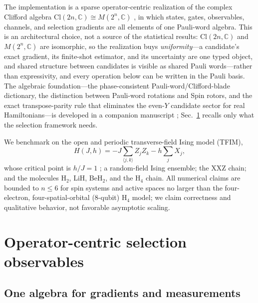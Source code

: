 \documentclass[aps,pra,reprint,superscriptaddress,nofootinbib,floatfix]{revtex4-2}
\newcommand{\Cl}{\mathrm{Cl}}
\newcommand{\C}{\mathbb{C}}
\begin{document}
The implementation is a sparse operator-centric realization of the complex Clifford algebra $\Cl(2n,\C)\cong M(2^n,\C)$ \cite{somaroo1998operations,hrdina2022clifford,silva2025operator}, in which states, gates, observables, channels, and selection gradients are all elements of one Pauli-word algebra. This is an architectural choice, not a source of the statistical results: $\Cl(2n,\C)$ and $M(2^n,\C)$ are isomorphic, so the realization buys \emph{uniformity}---a candidate's exact gradient, its finite-shot estimator, and its uncertainty are one typed object, and shared structure between candidates is visible as shared Pauli words---rather than expressivity, and every operation below can be written in the Pauli basis. The algebraic foundation---the phase-consistent Pauli-word/Clifford-blade dictionary, the distinction between Pauli-word rotations and Spin rotors, and the exact transpose-parity rule that eliminates the even-$Y$ candidate sector for real Hamiltonians---is developed in a companion manuscript \cite{utama2025operatorcentric}; Sec.~\ref{sec:foundation} recalls only what the selection framework needs.

We benchmark on the open and periodic transverse-field Ising model (TFIM),
\begin{equation}
H(J,h)=-J\sum_{\langle j,k\rangle}Z_jZ_k-h\sum_{j}X_j,
\label{eq:tfim}
\end{equation}
whose critical point is $h/J=1$ \cite{pfeuty1970ising}; a random-field Ising ensemble; the XXZ chain; and the molecules H$_2$, LiH, BeH$_2$, and the H$_4$ chain. All numerical claims are bounded to $n\le6$ for spin systems and active spaces no larger than the four-electron, four-spatial-orbital ($8$-qubit) H$_4$ model; we claim correctness and qualitative behavior, not favorable asymptotic scaling.

\section{Operator-centric selection observables}
\label{sec:foundation}

\subsection{One algebra for gradients and measurements}
\end{document}
